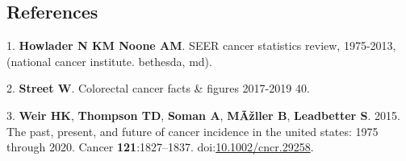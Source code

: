 \documentclass[11pt,]{article}
\begin{document}
\newpage

\subsection{References}\label{references}

\hypertarget{refs}{}
\hypertarget{ref-seer_2016}{}
1. \textbf{Howlader N KM \textnormal{Noone AM}}. SEER cancer statistics
review, 1975-2013, (national cancer institute. bethesda, md).

\hypertarget{ref-street_colorectal_nodate}{}
2. \textbf{Street W}. Colorectal cancer facts \& figures 2017-2019 40.

\hypertarget{ref-weir_past_2015}{}
3. \textbf{Weir HK}, \textbf{Thompson TD}, \textbf{Soman A},
\textbf{MÃžller B}, \textbf{Leadbetter S}. 2015. The past, present, and
future of cancer incidence in the united states: 1975 through 2020.
Cancer \textbf{121}:1827--1837.
doi:\href{https://doi.org/10.1002/cncr.29258}{10.1002/cncr.29258}.
\end{document}
